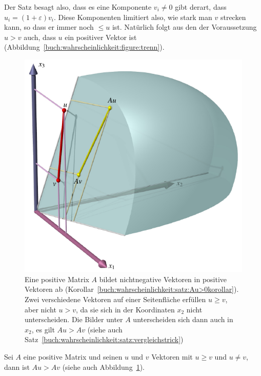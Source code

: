Der Satz besagt also, dass es eine Komponente $v_i\ne 0$ gibt
derart, dass $u_i = (1+\varepsilon)v_i$.
Diese Komponenten limitiert also, wie stark man $v$ strecken kann,
so dass er immer noch $\le u$ ist.
Natürlich folgt aus den der Voraussetzung $u>v$ auch, dass $u$ ein 
positiver Vektor ist (Abbildung~\ref{buch:wahrscheinlichkeit:figure:trenn}).

\begin{figure}
\centering
\includegraphics{chapters/80-wahrscheinlichkeit/images/vergleich.pdf}
\caption{Eine positive Matrix $A$ bildet nichtnegative Vektoren in
positive Vektoren ab
(Korollar~\ref{buch:wahrscheinlichkeit:satz:Au>0korollar}).
Zwei verschiedene Vektoren auf einer Seitenfläche erfüllen $u\ge v$,
aber nicht $u>v$, da sie sich in der Koordinaten $x_2$ nicht unterscheiden.
Die Bilder unter $A$ unterscheiden sich dann auch in $x_2$, es gilt
$Au>Av$ (siehe auch Satz~\ref{buch:wahrscheinlichkeit:satz:vergleichstrick})
\label{buch:wahrscheinlichkeit:fig:vergleich}}
\end{figure}

\begin{satz}[Vergleichstrick]
\label{buch:wahrscheinlichkeit:satz:vergleichstrick}
%
Sei $A$ eine positive Matrix und seinen $u$ und $v$ Vektoren
mit $u\ge v$ und $u\ne v$, dann ist $Au > Av$
(siehe auch Abbildung~\ref{buch:wahrscheinlichkeit:fig:vergleich}).
\end{satz}

